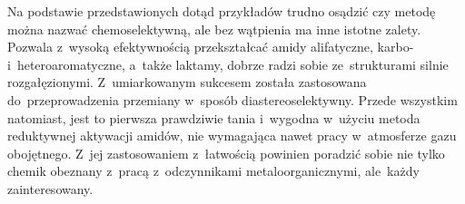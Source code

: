Na podstawie przedstawionych dotąd przykładów trudno osądzić czy metodę można nazwać
  chemoselektywną, ale bez wątpienia ma inne istotne zalety.
Pozwala z~wysoką efektywnością przekształcać amidy alifatyczne, karbo- i~heteroaromatyczne,
  a~także laktamy, dobrze radzi sobie ze~strukturami silnie rozgałęzionymi.
Z~umiarkowanym sukcesem została zastosowana do~przeprowadzenia przemiany w~sposób
  diastereoselektywny.
Przede wszystkim natomiast, jest to pierwsza prawdziwie tania i~wygodna w~użyciu metoda
  reduktywnej aktywacji amidów, nie wymagająca nawet pracy w~atmosferze gazu obojętnego.
Z~jej zastosowaniem z~łatwością powinien poradzić sobie nie tylko chemik obeznany z~pracą
  z~odczynnikami metaloorganicznymi, ale~każdy zainteresowany.
